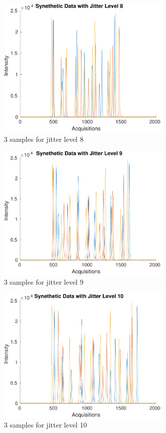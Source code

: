 \documentclass[preprint,12pt]{elsarticle}
\begin{document}
\begin{figure}[h]
    \centering
    \includegraphics[width=0.75\textwidth]{figures/jitter_illustration8.pdf}
    \caption{3 samples for jitter level 8}
    \label{fig:afigure8}
\end{figure}

\begin{figure}[h]
    \centering
    \includegraphics[width=0.75\textwidth]{figures/jitter_illustration9.pdf}
    \caption{3 samples for jitter level 9}
    \label{fig:afigure9}
\end{figure}

\begin{figure}[h]
    \centering
    \includegraphics[width=0.75\textwidth]{figures/jitter_illustration10.pdf}
    \caption{3 samples for jitter level 10}
    \label{fig:afigure10}
\end{figure}
\end{document}

